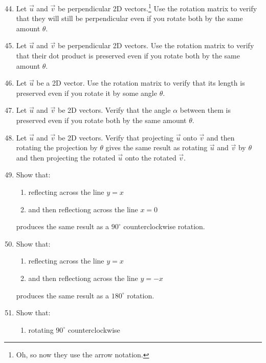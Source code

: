 \documentclass{article}
\begin{document}
\begin{enumerate}
    \setcounter{enumi}{43}
    \item Let \(\overrightarrow{u}\) and \(\overrightarrow{v}\) be perpendicular 2D vectors.\footnote{Oh, so now they use the arrow notation.} Use the rotation matrix to verify that they will still be perpendicular even if you rotate both 
    by the same amount \(\theta\). 
    \item Let \(\overrightarrow{u}\) and \(\overrightarrow{v}\) be perpendicular 2D vectors. Use the rotation matrix to verify that their dot product is preserved even if you rotate both 
    by the same amount \(\theta\). 
    \item Let \(\overrightarrow{u}\) be a 2D vector. Use the rotation matrix to verify that its length is preserved even if you rotate it by some angle \(\theta\). 
    \item Let \(\overrightarrow{u}\) and \(\overrightarrow{v}\) be 2D vectors. Verify that the angle \(\alpha\) between them is preserved even if you rotate both by the same amount \(\theta\). 
    \item Let \(\overrightarrow{u}\) and \(\overrightarrow{v}\) be 2D vectors. Verify that projecting \(\overrightarrow{u}\) onto \(\overrightarrow{v}\) and then rotating the projection by \(\theta\) gives
    the same result as rotating \(\overrightarrow{u}\) and \(\overrightarrow{v}\) by \(\theta\) and then projecting the rotated \(\overrightarrow{u}\) onto the rotated \(\overrightarrow{v}\). 
    \item Show that:\begin{enumerate}
        \item reflecting across the line \(y = x\)
        \item and then reflectiong across the line \(x=0\)
    \end{enumerate} produces the same result as a \(90^\circ\) counterclockwise rotation.
    \item Show that:\begin{enumerate}
        \item reflecting across the line \(y=x\)
        \item and then reflectiong across the line \(y = -x\) 
    \end{enumerate} produces the same result as a \(180^\circ\) rotation. 
    \item Show that:\begin{enumerate}
        \item rotating \(90^\circ\) counterclockwise

\end{enumerate}
\end{enumerate}
\end{document}
